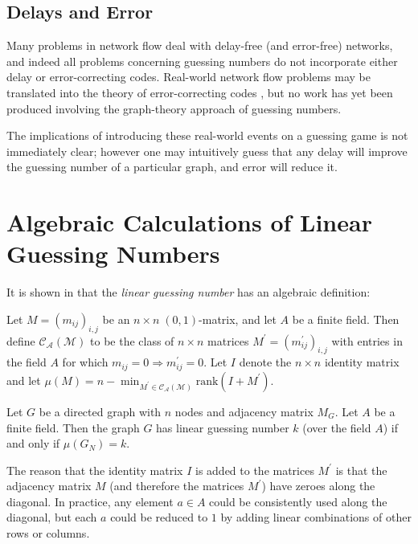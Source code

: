 \subsection{Delays and Error}

Many problems in network flow deal with delay-free (and error-free) networks, and indeed all problems concerning guessing numbers do not incorporate either delay or error-correcting codes. Real-world network flow problems may be translated into the theory of error-correcting codes \cite{riah2004}, but no work has yet been produced involving the graph-theory approach of guessing numbers.

The implications of introducing these real-world events on a guessing game is not immediately clear; however one may intuitively guess that any delay will improve the guessing number of a particular graph, and error will reduce it.

\section{Algebraic Calculations of Linear Guessing Numbers}

It is shown in \cite{riis2005util} that the \emph{linear guessing number} has an algebraic definition:

Let $M = (m_{ij})_{i, j}$ be an $n \times n \; (0, 1)$-matrix, and let $A$ be a finite field. Then define $\mathcal{C_A(M)}$ to be the class of $n \times n$ matrices $M^\prime = (m^\prime_{ij})_{i, j}$ with entries in the field $A$ for which $m_{ij} = 0 \Rightarrow m^\prime_{ij} = 0$. Let $I$ denote the $n \times n$ identity matrix and let $\mu(M) = n - \min_{M^\prime \in \mathcal{C_A(M)}} \mbox{rank}(I + M^\prime)$.

\begin{theorem}
 Let $G$ be a directed graph with $n$ nodes and adjacency matrix $M_G$. Let $A$ be a finite field. Then the graph $G$ has linear guessing number $k$ (over the field $A$) if and only if $\mu(G_N) = k$.
 \label{alg_gn}
\end{theorem}

\begin{remark}
 The reason that the identity matrix $I$ is added to the matrices $M^\prime$ is that the adjacency matrix $M$ (and therefore the matrices $M^\prime$) have zeroes along the diagonal. In practice, any element $a \in A$ could be consistently used along the diagonal, but each $a$ could be reduced to $1$ by adding linear combinations of other rows or columns.
\end{remark}

